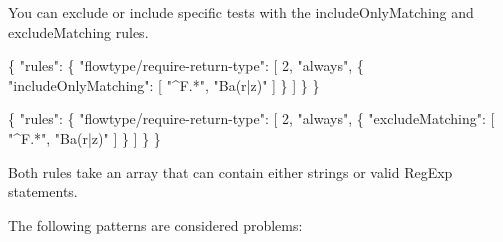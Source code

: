 You can exclude or include specific tests with the {\ttfamily include\+Only\+Matching} and {\ttfamily exclude\+Matching} rules.


\begin{DoxyCode}
\{
    "rules": \{
        "flowtype/require-return-type": [
            2,
            "always",
            \{
              "includeOnlyMatching": [
                  "^F.*",
                  "Ba(r|z)"
              ]
            \}
        ]
    \}
\}

\{
    "rules": \{
        "flowtype/require-return-type": [
            2,
            "always",
            \{
              "excludeMatching": [
                  "^F.*",
                  "Ba(r|z)"
              ]
            \}
        ]
    \}
\}
\end{DoxyCode}


Both rules take an array that can contain either strings or valid Reg\+Exp statements.

The following patterns are considered problems\+:


